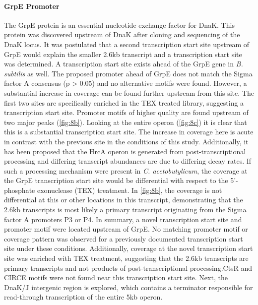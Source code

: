\paragraph{GrpE Promoter}
The GrpE protein is an essential nucleotide exchange factor for DnaK. This protein was discovered upstream of DnaK after cloning and sequencing of the DnaK locus\cite{80}. It was postulated that a second transcription start site upstream of GrpE would explain the smaller 2.6kb transcript and a transcription start site was determined\cite{80}. A transcription start site exists ahead of the GrpE gene in \textit{B. subtilis} as well\cite{81}. The proposed promoter ahead of GrpE does not match the Sigma factor A consensus (p > 0.05) and no alternative motifs were found. However, a substantial increase in coverage can be found further upstream from this site. The first two sites are specifically enriched in the TEX treated library, suggesting a transcription start site. Promoter motifs of higher quality are found upstream of two major peaks (\ref{fig:8b}). Looking at the entire operon (\ref{fig:8c}) it is clear that this is a substantial transcription start site. The increase in coverage here is acute in contrast with the previous site in the conditions of this study. Additionally, it has been proposed that the HrcA operon is generated from post-transcriptional processing and differing transcript abundances are due to differing decay rates\cite{81}. If such a processing mechanism were present in \textit{C. acetobutylicum}, the coverage at the GrpE transcription start site would be differential with respect to the 5'-phosphate exonuclease (TEX) treatment. In \ref{fig:8b}, the coverage is not differential at this or other locations in this transcript, demonstrating that the 2.6kb transcripts is most likely a primary transcript originating from the Sigma factor A promoters P3 or P4. In summary, a novel transcription start site and promoter motif were located upstream of GrpE. No matching promoter motif or coverage pattern was observed for a previously documented transcription start site under these conditions. Additionally, coverage at the novel transcription start site was enriched with TEX treatment, suggesting that the 2.6kb transcripts are primary transcripts and not products of post-transcriptional processing.CtsR and CIRCE motifs were not found near this transcription start site. Next, the DnaK/J intergenic region is explored, which contains a terminator responsible for read-through transcription of the entire 5kb operon.

